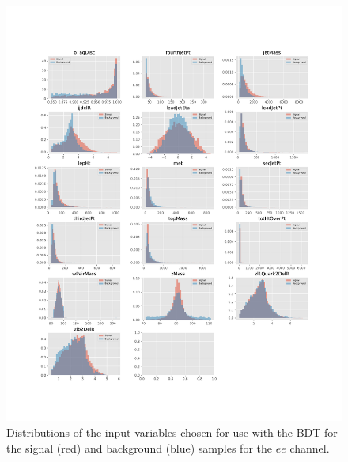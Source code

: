 \begin{figure}[htb]
\centering
\vspace*{-3.25cm}\hspace*{-2.3cm}\includegraphics[width=1.27\textwidth]{figs/background-estimation/plots/vars_ee.pdf}
\vspace*{-1cm}\caption{
Distributions of the input variables chosen for use with the BDT for the signal (red) and background (blue) samples for the $ee$ channel.}
\label{fig:inputFeaturesDistributions_ee}
\end{figure}

